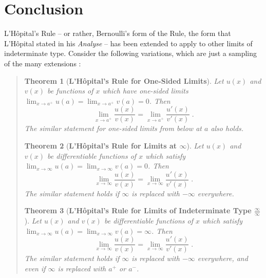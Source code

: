 \documentclass[11pt]{article}
\newtheorem*{thm*}{Theorem}
\begin{document}
\section{Conclusion}

L'H\^opital's Rule -- or rather, Bernoulli's form of the Rule, the form that L'H\^opital stated in his \emph{Analyse} -- has been extended to apply to other limits of indeterminate type. Consider the following variations, which are just a sampling of the many extensions \citep[p.~198]{Spivak}:
\begin{quote}
\begin{thm*}[{\bf L'H\^opital's Rule for One-Sided Limits}]
Let $u(x)$ and $v(x)$ be functions of $x$ which have one-sided limits ${\displaystyle \lim_{x\to a^+}u(a)=\lim_{x\to a^+} v(a)=0}$. Then
	\begin{equation*}
	\lim_{x\to a^+} \frac{u(x)}{v(x)}=\lim_{x\to a^+} \frac{u'(x)}{v'(x)}\;.
	\end{equation*}
The similar statement for one-sided limits from below at $a$ also holds.
\end{thm*}

\bigskip
\begin{thm*}[{\bf L'H\^opital's Rule for Limits at $\infty$}] %
Let $u(x)$ and $v(x)$ be differentiable functions of $x$ which satisfy ${\displaystyle \lim_{x\to \infty} u(a)=\lim_{x\to \infty} v(a)=0}$. Then
	\begin{equation*}
	\lim_{x\to \infty} \frac{u(x)}{v(x)}=\lim_{x\to \infty} \frac{u'(x)}{v'(x)}\;.
	\end{equation*}The similar statement holds if $\infty$ is replaced with $-\infty$ everywhere.
\end{thm*}

\bigskip
\begin{thm*}[{\bf L'H\^opital's Rule for Limits of Indeterminate Type $\frac{\infty}{\infty}$}]
Let $u(x)$ and $v(x)$ be differentiable functions of $x$ which satisfy ${\displaystyle \lim_{x\to \infty} u(a)=\lim_{x\to \infty} v(a)=\infty}$. Then
	\begin{equation*}
	\lim_{x\to \infty} \frac{u(x)}{v(x)}=\lim_{x\to \infty} \frac{u'(x)}{v'(x)}\;.
	\end{equation*}The similar statement holds if $\infty$ is replaced with $-\infty$ everywhere, and even if $\infty$ is replaced with $a^+$ or $a^-$.
\end{thm*}
\end{quote}
\end{document}

